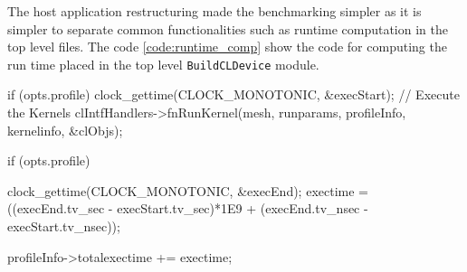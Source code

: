 The host application restructuring made the benchmarking simpler as it is
simpler to separate common functionalities such as runtime computation
in the top level files. The code \ref{code:runtime_comp} show the code
for computing the run time placed in the top level \texttt{BuildCLDevice}
module.
\begin{CppCode}[caption=Runtime computation code for the MIDG2 Designs
    using \texttt{clock\_gettime()}, frame=tlrb, label=code:runtime_comp]
if (opts.profile)
{
    clock_gettime(CLOCK_MONOTONIC, &execStart);
}
// Execute the Kernels
clIntfHandlers->fnRunKernel(mesh, runparams, profileInfo, kernelinfo, &clObjs);

if (opts.profile)
{
    clock_gettime(CLOCK_MONOTONIC, &execEnd);
    exectime = ((execEnd.tv_sec - execStart.tv_sec)*1E9
            + (execEnd.tv_nsec - execStart.tv_nsec));

    profileInfo->totalexectime += exectime;
}
\end{CppCode}

